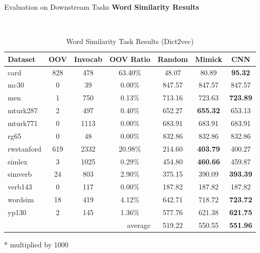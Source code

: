 \documentclass{beamer}
\begin{document}
\begin{frame}{Evaluation on Downstream Tasks}
    \textbf{Word Similarity Results}
    \begin{table}[!ht]
        \footnotesize
        \begin{threeparttable} 
        \begin{center}
          \caption{Word Similarity Task Results (Dict2vec)}
          ~\\
          \label{tab:wordsim:dict2vec}
          \begin{tabular}{l|c|c|c|c|c|c}
            \textbf{Dataset} & \textbf{OOV} & \textbf{Invocab} &
            \textbf{OOV Ratio} & \textbf{Random}\tnote{*} &
            \textbf{Mimick}\tnote{*} & \textbf{CNN}\tnote{*}\\
            \hline
            card & 828 & 478 & 63.40\% & 48.07 & 80.89 & \textbf{95.32}\\
            mc30 & 0 & 39 & 0.00\% & 847.57 & 847.57 & 847.57\\
            men & 1 & 750 & 0.13\% & 713.16 & 723.63 & \textbf{723.89}\\
            mturk287 & 2 & 497 & 0.40\% & 652.27 & \textbf{655.32} & 653.13\\
            mturk771 & 0 & 1113 & 0.00\% & 683.91 & 683.91 & 683.91\\
            rg65 & 0 & 48 & 0.00\% & 832.86 & 832.86 & 832.86\\
            rwstanford & 619 & 2332 & 20.98\% & 214.60 & \textbf{403.79} & 400.27\\
            simlex & 3 & 1025 & 0.29\% & 454.80 & \textbf{460.66} & 459.87\\
            simverb & 24 & 803 & 2.90\% & 375.15 & 390.09 & \textbf{393.39}\\
            verb143 & 0 & 117 & 0.00\% & 187.82 & 187.82 & 187.82\\
            wordsim & 18 & 419 & 4.12\% & 642.71 & 718.72 & \textbf{723.72}\\
            yp130 & 2 & 145 & 1.36\% & 577.76 & 621.38 & \textbf{621.75}\\
            \hline
            \multicolumn{4}{r|}{average} & 519.22 & 550.55 & \textbf{551.96}\\
          \end{tabular}
          \begin{tablenotes}
            \item[*] multiplied by 1000
          \end{tablenotes}
        \end{center}
      \end{threeparttable} 
      \end{table}
\end{frame}
\end{document}
